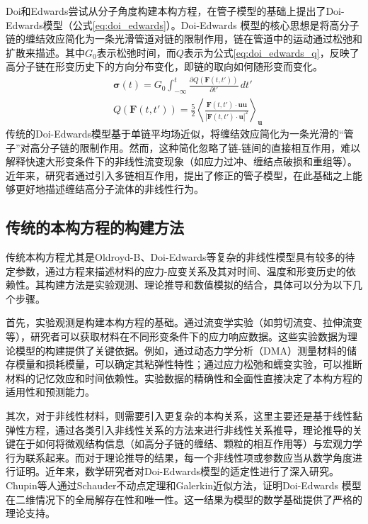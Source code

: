 Doi和Edwards尝试从分子角度构建本构方程，在管子模型的基础上提出了Doi-Edwards模型（公式\eqref{eq:doi_edwards}）。Doi-Edwards 模型的核心思想是将高分子链的缠结效应简化为一条光滑管道对链的限制作用，链在管道中的运动通过松弛和扩散来描述\cite{doi1978dynamics1,doi1978dynamics2,doi1978dynamics3,doi1979dynamics4}。其中$G_0$表示松弛时间，而$Q$表示为公式\eqref{eq:doi_edwards_q}，反映了高分子链在形变历史下的方向分布变化，即链的取向如何随形变而变化。
\begin{align}
   & \boldsymbol{\sigma}(t)  = G_0 \int_{-\infty}^t \frac{\partial Q(\mathbf{F}(t,t'))}{\partial t'} \, dt'    \label{eq:doi_edwards}                                                                  \\
   & Q(\mathbf{F}(t,t'))     = \frac{5}{2} \left\langle \frac{\mathbf{F}(t,t') \cdot \mathbf{u} \mathbf{u}}{|\mathbf{F}(t,t') \cdot \mathbf{u}|^2} \right\rangle_{\mathbf{u}} \label{eq:doi_edwards_q}
\end{align}
传统的Doi-Edwards模型基于单链平均场近似，将缠结效应简化为一条光滑的“管子”对高分子链的限制作用。然而，这种简化忽略了链-链间的直接相互作用，难以解释快速大形变条件下的非线性流变现象（如应力过冲、缠结点破损和重组等）。近年来，研究者通过引入多链相互作用，提出了修正的管子模型，在此基础之上能够更好地描述缠结高分子流体的非线性行为\cite{OConnor1992ConfirmationOT,hassager2010constitutive,chupin2017mathematical}。

\subsection{传统的本构方程的构建方法}
传统本构方程尤其是Oldroyd-B、Doi-Edwards等复杂的非线性模型具有较多的待定参数，通过方程来描述材料的应力-应变关系及其对时间、温度和形变历史的依赖性。其构建方法是实验观测、理论推导和数值模拟的结合，具体可以分为以下几个步骤。

首先，实验观测是构建本构方程的基础。通过流变学实验（如剪切流变、拉伸流变等），研究者可以获取材料在不同形变条件下的应力响应数据。这些实验数据为理论模型的构建提供了关键依据。例如，通过动态力学分析（DMA）测量材料的储存模量和损耗模量，可以确定其粘弹性特性；通过应力松弛和蠕变实验，可以推断材料的记忆效应和时间依赖性。实验数据的精确性和全面性直接决定了本构方程的适用性和预测能力\cite{alvesNumericalMethodsViscoelastic2021,stadlerWhatAreTypical2014}。

其次，对于非线性材料，则需要引入更复杂的本构关系，这里主要还是基于线性黏弹性方程，通过各类引入非线性关系的方法来进行非线性关系推导，理论推导的关键在于如何将微观结构信息（如高分子链的缠结、颗粒的相互作用等）与宏观力学行为联系起来。而对于理论推导的结果，每一个非线性项或参数应当从数学角度进行证明\cite{zhai2024global}。近年来，数学研究者对Doi-Edwards模型的适定性进行了深入研究。Chupin等人通过Schauder不动点定理和Galerkin近似方法，证明Doi-Edwards 模型在二维情况下的全局解存在性和唯一性\cite{hassager2010constitutive}。这一结果为模型的数学基础提供了严格的理论支持。

